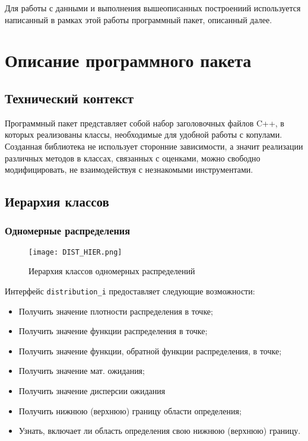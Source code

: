 Для работы с данными и выполнения вышеописанных построениий используется написанный в рамках этой работы программный пакет, описанный далее.

\section*{Описание программного пакета}
\subsection*{Технический контекст}

Программный пакет представляет собой набор заголовочных файлов C++, в которых реализованы классы, необходимые для удобной работы с копулами. Созданная библиотека не использует сторонние зависимости, а значит реализации различных методов в классах, связанных с оценками, можно свободно модифицировать, не взаимодействуя с незнакомыми инструментами.

\subsection*{Иерархия классов}

\subsubsection*{Одномерные распределения}

\begin{figure}[H]
	\centering
	\texttt{[image: DIST\_HIER.png]}
	\caption{Иерархия классов одномерных распределений}
\end{figure}

Интерфейс \texttt{distribution\_i} предоставляет следующие возможности:
\begin{itemize}
  \item Получить значение плотности распределения в точке;
  \item Получить значение функции распределения в точке;
  \item Получить значение функции, обратной функции распределения, в точке;

  \item Получить значение мат. ожидания;
  \item Получить значение дисперсии ожидания

  \item Получить нижнюю (верхнюю) границу области определения;

  \item Узнать, включает ли область определения свою нижнюю (верхнюю) границу.
\end{itemize}

